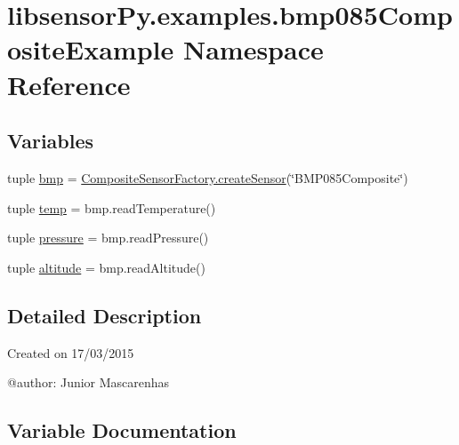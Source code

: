 \hypertarget{namespacelibsensorPy_1_1examples_1_1bmp085CompositeExample}{}\section{libsensor\+Py.\+examples.\+bmp085\+Composite\+Example Namespace Reference}
\label{namespacelibsensorPy_1_1examples_1_1bmp085CompositeExample}
\subsection*{Variables}
\begin{DoxyCompactItemize}
\item 
tuple \hyperlink{namespacelibsensorPy_1_1examples_1_1bmp085CompositeExample_a573049e3ed87962c4f8c7d2ba73744e5}{bmp} = \hyperlink{classconcretefactory_1_1compositeSensorFactory_1_1CompositeSensorFactory_a2d3860525907a2f2d37c98163150ea03}{Composite\+Sensor\+Factory.\+create\+Sensor}(\char`\"{}B\+M\+P085\+Composite\char`\"{})
\item 
tuple \hyperlink{namespacelibsensorPy_1_1examples_1_1bmp085CompositeExample_aa5e5d1869c9e1ab077e648fb20c58c4e}{temp} = bmp.\+read\+Temperature()
\item 
tuple \hyperlink{namespacelibsensorPy_1_1examples_1_1bmp085CompositeExample_a5cff015035aa44f207e1475e6477ed99}{pressure} = bmp.\+read\+Pressure()
\item 
tuple \hyperlink{namespacelibsensorPy_1_1examples_1_1bmp085CompositeExample_a8652461e926b039f8d96506a5dbf9ddd}{altitude} = bmp.\+read\+Altitude()
\end{DoxyCompactItemize}


\subsection{Detailed Description}
\begin{DoxyVerb}Created on 17/03/2015

@author: Junior Mascarenhas
\end{DoxyVerb}
 

\subsection{Variable Documentation}
\hypertarget{namespacelibsensorPy_1_1examples_1_1bmp085CompositeExample_a8652461e926b039f8d96506a5dbf9ddd}{}

